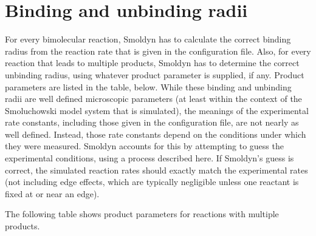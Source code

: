 \documentclass {scrbook}
\begin{document}
\section{Binding and unbinding radii}

For every bimolecular reaction, Smoldyn has to calculate the correct binding radius from the reaction rate that is given in the configuration file. Also, for every reaction that leads to multiple products, Smoldyn has to determine the correct unbinding radius, using whatever product parameter is supplied, if any. Product parameters are listed in the table, below. While these binding and unbinding radii are well defined microscopic parameters (at least within the context of the Smoluchowski model system that is simulated), the meanings of the experimental rate constants, including those given in the configuration file, are not nearly as well defined. Instead, those rate constants depend on the conditions under which they were measured. Smoldyn accounts for this by attempting to guess the experimental conditions, using a process described here. If Smoldyn's guess is correct, the simulated reaction rates should exactly match the experimental rates (not including edge effects, which are typically negligible unless one reactant is fixed at or near an edge).

The following table shows product parameters for reactions with multiple products.
\end{document}
